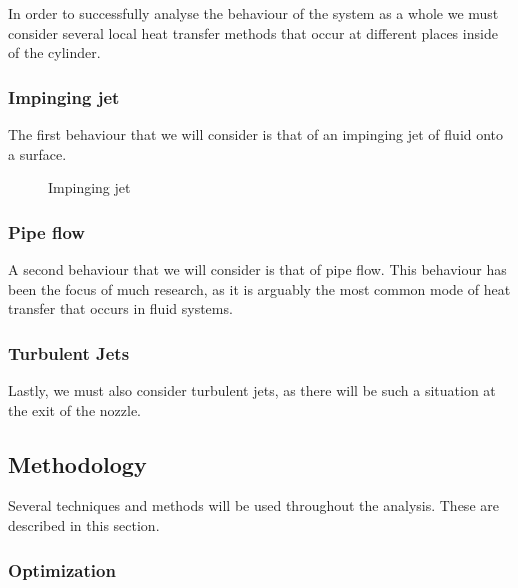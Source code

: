 In order to successfully analyse the behaviour of the system as a whole we must consider several local heat transfer methods that occur at different places inside of the cylinder.



\subsubsection{Impinging jet}

 The first behaviour that we will consider is that of an impinging jet of fluid onto a surface. 
 
 
 \begin{figure}[h]
\begin{centering}
\caption{Impinging jet}
\label{fig:inpinging_jet}
\end{centering}
\end{figure}


 
\subsubsection{Pipe flow}

A second behaviour that we will consider is that of pipe flow. This behaviour has been the focus of much research, as it is arguably the most common mode of heat transfer that occurs in fluid systems.

\subsubsection{Turbulent Jets}

Lastly, we must also consider turbulent jets, as there will be such a situation at the exit of the nozzle. \cite{pope2000}


\subsection{Methodology}

Several techniques and methods will be used throughout the analysis. These are described in this section.

\subsubsection{Optimization}
